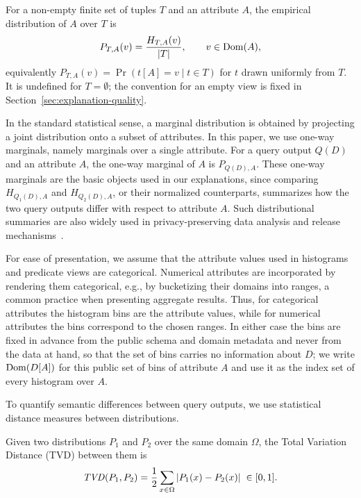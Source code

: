 \begin{definition}
\label{def:empirical-distribution}
For a non-empty finite set of tuples $T$ and an attribute $A$, the empirical
distribution of $A$ over $T$ is
\[
P_{T,A}(v) = \frac{H_{T,A}(v)}{|T|},
\qquad v\in\operatorname{Dom}(A),
\]
equivalently $P_{T,A}(v)=\Pr\left(t[A]=v \mid t\in T\right)$ for $t$ drawn uniformly
from $T$. It is undefined for $T=\emptyset$; the convention for an empty view is fixed in
Section~\ref{sec:explanation-quality}.
\end{definition}

In the standard statistical sense, a marginal distribution is obtained by
projecting a joint distribution onto a subset of attributes. In this
paper, we use one-way marginals, namely marginals over a single
attribute.
For a query output $Q(D)$ and an attribute $A$, the one-way marginal of
$A$ is $P_{Q(D),A}$.
These one-way marginals are the basic objects used in our explanations, since
comparing $H_{Q_1(D),A}$ and $H_{Q_2(D),A}$, or their normalized counterparts,
summarizes how the two query outputs differ with respect to attribute $A$.
Such distributional summaries are also widely used in privacy-preserving data
analysis and release mechanisms~\cite{TheAlgFoundDP2014}.

For ease of presentation, we assume that the attribute values used in
histograms and predicate views are categorical. Numerical attributes are
incorporated by rendering them categorical, e.g., by bucketizing their
domains into ranges, a common practice when presenting aggregate
results. Thus, for categorical attributes the histogram bins are the
attribute values, while for numerical attributes the bins correspond to
the chosen ranges.
In either case the bins are fixed in advance from the public schema and domain
metadata and never from the data at hand, so that the set of bins carries no
information about $D$; we write $\operatorname{Dom}(D[A])$ for this public set of bins of
attribute $A$ and use it as the index set of every histogram over $A$.



To quantify semantic differences between query outputs, we use statistical distance
measures between distributions.

\begin{definition}
\label{def:tvd}
Given two distributions $P_1$ and $P_2$ over the same domain $\Omega$, the Total
Variation Distance (TVD) between them is
\[
\mathit{TVD}(P_1,P_2)
=
\frac{1}{2}
\sum_{x\in\Omega}
|P_1(x)-P_2(x)| \; \in [0,1].
\]
\end{definition}

